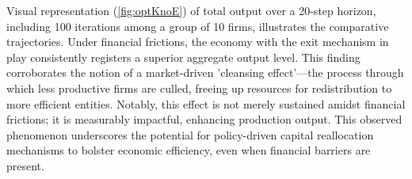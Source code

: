 \documentclass[12pt]{report}
\begin{document}
Visual representation (\ref{fig:optKnoE}) of total output over a 20-step horizon, including 100 iterations among a group of 10 firms,
illustrates the comparative trajectories. Under financial frictions, the economy with the exit mechanism in play
consistently registers a superior aggregate output level. This finding corroborates the notion of a market-driven
'cleansing effect'—the process through which less productive firms are culled, freeing up resources for redistribution
to more efficient entities. Notably, this effect is not merely sustained amidst financial frictions; it is measurably
impactful, enhancing production output. This observed phenomenon underscores the potential for policy-driven capital
reallocation mechanisms to bolster economic efficiency, even when financial barriers are present.
\end{document}
